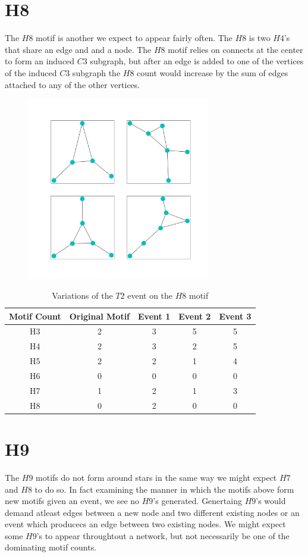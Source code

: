\section{H8}
The $H8$ motif is another we expect to appear fairly often. The $H8$
is two $H4$'s that share an edge and and a node. The $H8$ motif 
relies on connects at the center to form an induced $C3$ subgraph, but after an 
edge is added to one of the vertices of the induced $C3$ subgraph the 
$H8$ count would increase by the sum of edges attached to any of the other vertices. 

\begin{figure}[!ht]
    \includegraphics[width=8cm]{Images/H8_evolution.png}
    \centering
\end{figure}

\FloatBarrier
\begin{table}
    \centering
    \begin{tabular}{||c c c c c||} 
    \hline
    Motif Count & Original Motif & Event 1 & Event 2 & Event 3 \\ [0.5ex] 
    \hline\hline
    H3 & 2 & 3 & 5 & 5\\ 
    \hline
    H4 & 2 & 3 & 2 & 5 \\
    \hline
    H5 & 2 & 2 & 1 & 4 \\
    \hline
    H6 & 0 & 0 & 0 & 0 \\
    \hline
    H7 & 1 & 2 & 1 & 3 \\
    \hline
    H8 & 0 & 2 & 0 & 0\\
    \hline
   \end{tabular}
   \caption{Variations of the $T2$ event on the $H8$ motif}
   \label{table:6}
\end{table}

\section{H9}
The $H9$ motifs do not form around stars in the same way we might expect $H7$ and $H8$ to 
do so. In fact examining the manner in which the motifs above form new motifs given an event,
we see no $H9$'s generated. Genertaing $H9$'s would demand atleast edges between a new node and two 
different existing nodes or an event which producecs an edge between two existing nodes. We might expect
some $H9$'s to appear throughtout a network, but not necessarily be one of the dominating motif counts.

